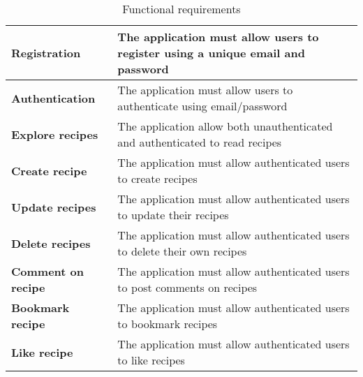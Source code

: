 \begin{table}[!t]
    \centering
    \caption{Functional requirements}
    \label{tab:functional-description}
    \begin{tabulary}{1.0\textwidth}{|L|L|}
        \hline
        \textbf{Registration} & The application must allow users to register using a unique email and password \\
        \hline
        \textbf{Authentication} & The application must allow users to authenticate using email/password \\ 
        \hline
        \textbf{Explore recipes} & The application allow both unauthenticated and authenticated to read recipes \\
        \hline
        \textbf{Create recipe} & The application must allow authenticated users to create recipes \\
        \hline
        \textbf{Update recipes} & The application must allow authenticated users to update their recipes \\
        \hline
        \textbf{Delete recipes} & The application must allow authenticated users to delete their own recipes \\
        \hline
        \textbf{Comment on recipe} & The application must allow authenticated users to post comments on recipes \\
        \hline
        \textbf{Bookmark recipe} & The application must allow authenticated users to bookmark recipes \\
        \hline
        \textbf{Like recipe} & The application must allow authenticated users to like recipes \\
        \hline
    \end{tabulary}
\end{table}
